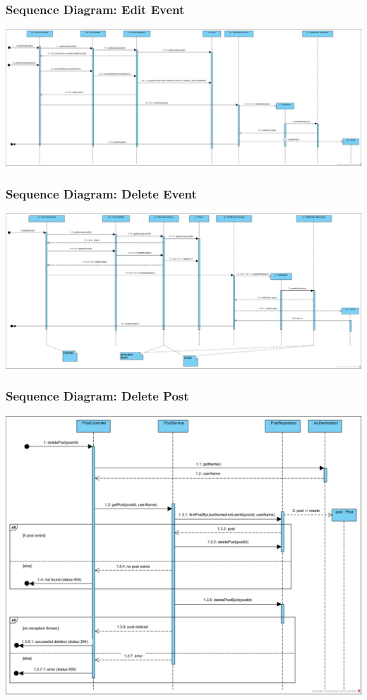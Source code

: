 \subsubsection{Sequence Diagram: Edit Event}
        \includegraphics[scale=0.32]{images/SD-UC05-EditEvent.png}
        \label{fig:SD-AddPageToEvent}
\subsubsection{Sequence Diagram: Delete Event}
        \includegraphics[scale=0.35]{images/SD-UC06-DeleteEvent.png}
        \label{fig:SD-AddPageToEvent}
\subsubsection{Sequence Diagram: Delete Post}
        \includegraphics[scale=0.65]{images/SD-UC12-DeletePost.png}
        \label{fig:SD-AddPageToEvent}